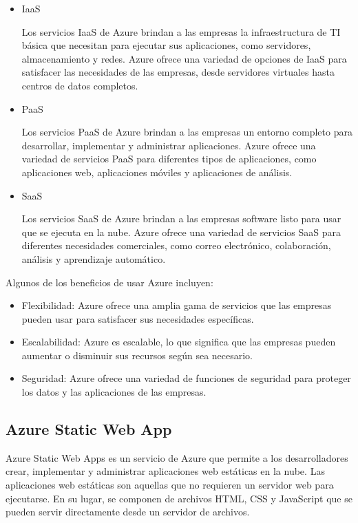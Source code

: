\begin{itemize}
    \item IaaS

    Los servicios IaaS de Azure brindan a las empresas la infraestructura de TI básica que necesitan para ejecutar 
    sus aplicaciones, como servidores, almacenamiento y redes. Azure ofrece una variedad de opciones de IaaS para 
    satisfacer las necesidades de las empresas, desde servidores virtuales hasta centros de datos completos.

    \item PaaS

    Los servicios PaaS de Azure brindan a las empresas un entorno completo para desarrollar, implementar y 
    administrar aplicaciones. Azure ofrece una variedad de servicios PaaS para diferentes tipos de aplicaciones, 
    como aplicaciones web, aplicaciones móviles y aplicaciones de análisis.

    \item SaaS

    Los servicios SaaS de Azure brindan a las empresas software listo para usar que se ejecuta en la nube. 
    Azure ofrece una variedad de servicios SaaS para diferentes necesidades comerciales, como correo 
    electrónico, colaboración, análisis y aprendizaje automático.
\end{itemize}

Algunos de los beneficios de usar Azure incluyen:
\begin{itemize}
    \item Flexibilidad: Azure ofrece una amplia gama de servicios que las empresas pueden usar para satisfacer sus necesidades específicas.
    \item Escalabilidad: Azure es escalable, lo que significa que las empresas pueden aumentar o disminuir sus recursos según sea necesario.
    \item Seguridad: Azure ofrece una variedad de funciones de seguridad para proteger los datos y las aplicaciones de las empresas.
\end{itemize}

\subsection{Azure Static Web App}

Azure Static Web Apps es un servicio de Azure que permite a los desarrolladores crear, implementar y administrar 
aplicaciones web estáticas en la nube. Las aplicaciones web estáticas son aquellas que no requieren un servidor web 
para ejecutarse. En su lugar, se componen de archivos HTML, CSS y JavaScript que se pueden servir directamente 
desde un servidor de archivos.

